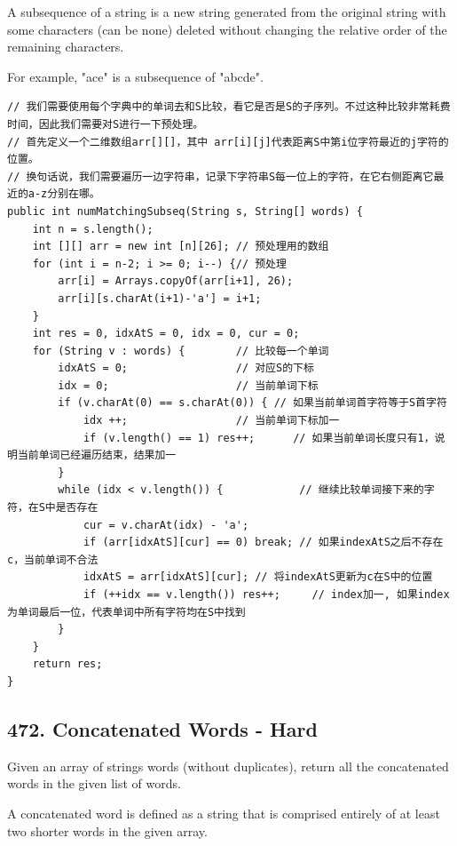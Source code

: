 \documentclass[9pt, b5paaper]{book}
\begin{document}
A subsequence of a string is a new string generated from the original string with some characters (can be none) deleted without changing the relative order of the remaining characters.

For example, "ace" is a subsequence of "abcde".
\begin{verbatim}
// 我们需要使用每个字典中的单词去和S比较，看它是否是S的子序列。不过这种比较非常耗费时间，因此我们需要对S进行一下预处理。
// 首先定义一个二维数组arr[][]，其中 arr[i][j]代表距离S中第i位字符最近的j字符的位置。
// 换句话说，我们需要遍历一边字符串，记录下字符串S每一位上的字符，在它右侧距离它最近的a-z分别在哪。
public int numMatchingSubseq(String s, String[] words) {
    int n = s.length();
    int [][] arr = new int [n][26]; // 预处理用的数组
    for (int i = n-2; i >= 0; i--) {// 预处理
        arr[i] = Arrays.copyOf(arr[i+1], 26);
        arr[i][s.charAt(i+1)-'a'] = i+1;
    }
    int res = 0, idxAtS = 0, idx = 0, cur = 0;
    for (String v : words) {        // 比较每一个单词
        idxAtS = 0;                 // 对应S的下标
        idx = 0;                    // 当前单词下标
        if (v.charAt(0) == s.charAt(0)) { // 如果当前单词首字符等于S首字符
            idx ++;                 // 当前单词下标加一
            if (v.length() == 1) res++;      // 如果当前单词长度只有1，说明当前单词已经遍历结束，结果加一
        }
        while (idx < v.length()) {            // 继续比较单词接下来的字符，在S中是否存在
            cur = v.charAt(idx) - 'a';
            if (arr[idxAtS][cur] == 0) break; // 如果indexAtS之后不存在c，当前单词不合法
            idxAtS = arr[idxAtS][cur]; // 将indexAtS更新为c在S中的位置
            if (++idx == v.length()) res++;     // index加一, 如果index为单词最后一位，代表单词中所有字符均在S中找到
        }
    }
    return res;
}
\end{verbatim}

\subsection{472. Concatenated Words - Hard}
\label{sec-2-1-9}
Given an array of strings words (without duplicates), return all the concatenated words in the given list of words.

A concatenated word is defined as a string that is comprised entirely of at least two shorter words in the given array.
\end{document}
